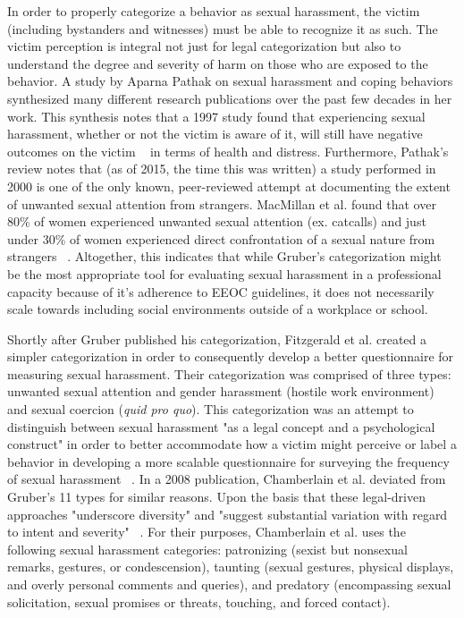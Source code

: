 In order to properly categorize a behavior as sexual harassment, the victim (including bystanders and witnesses) must be able to recognize it as such. The victim perception is integral not just for legal categorization but also to understand the degree and severity of harm on those who are exposed to the behavior. A study by Aparna Pathak on sexual harassment and coping behaviors synthesized many different research publications over the past few decades in her work. This synthesis notes that a 1997 study found that experiencing sexual harassment, whether or not the victim is aware of it, will still have negative outcomes on the victim ~\cite{schneider1997effects} in terms of health and distress. Furthermore, Pathak's review notes that (as of 2015, the time this was written) a study performed in 2000 is one of the only known, peer-reviewed attempt at documenting the extent of unwanted sexual attention from strangers. MacMillan et al. found that over 80\% of women experienced unwanted sexual attention (ex. catcalls) and just under 30\% of women experienced direct confrontation of a sexual nature from strangers ~\cite{macmillan2000street}. Altogether, this indicates that while Gruber's categorization might be the most appropriate tool for evaluating sexual harassment in a professional capacity because of it's adherence to EEOC guidelines, it does not necessarily scale towards including social environments outside of a workplace or school.

Shortly after Gruber published his categorization, Fitzgerald et al. created a simpler categorization in order to consequently develop a better questionnaire for measuring sexual harassment. Their categorization was comprised of three types: unwanted sexual attention and gender harassment (hostile work environment) and sexual coercion (\textit{quid pro quo}). This categorization was an attempt to distinguish between sexual harassment "as a legal concept and a psychological construct" in order to better accommodate how a victim might perceive or label a behavior in developing a more scalable questionnaire for surveying the frequency of sexual harassment ~\cite{fitzgerald1995measuring}. In a 2008 publication, Chamberlain et al. deviated from Gruber's 11 types for similar reasons. Upon the basis that these legal-driven approaches "underscore diversity" and "suggest substantial variation with regard to intent and severity" ~\cite{chamberlain2008newcategories}. For their purposes, Chamberlain et al. uses the following sexual harassment categories: patronizing (sexist but nonsexual remarks, gestures, or condescension), taunting (sexual gestures, physical displays, and overly personal comments and queries), and predatory (encompassing sexual solicitation, sexual promises or threats, touching, and forced contact).

